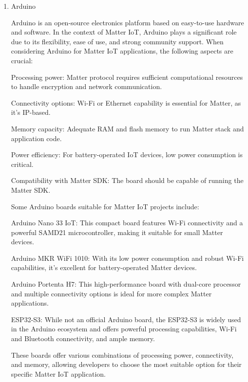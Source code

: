 \documentclass[conference]{IEEEtran}
\begin{document}
\begin{enumerate}[itemsep=2ex, parsep=1ex]
	\item Arduino
	      	      
	      Arduino is an open-source electronics platform based on easy-to-use
	      hardware and software. In the context of Matter IoT, Arduino plays a
	      significant role due to its flexibility, ease of use, and strong community
	      support. When considering Arduino for Matter IoT applications, the
	      following aspects are crucial:
	      	      
	      Processing power: Matter protocol requires sufficient computational resources
	      to handle encryption and network communication.
	      	      
	      Connectivity options: Wi-Fi or Ethernet capability is essential for Matter,
	      as it's IP-based.
	      	      
	      Memory capacity: Adequate RAM and flash memory to run Matter stack and
	      application code.
	      	      
	      Power efficiency: For battery-operated IoT devices, low power consumption
	      is critical.
	      	      
	      Compatibility with Matter SDK: The board should be capable of running the Matter
	      SDK.
	      	      
	      Some Arduino boards suitable for Matter IoT projects include:
	      	      
	      Arduino Nano 33 IoT: This compact board features Wi-Fi connectivity and a
	      powerful SAMD21 microcontroller, making it suitable for small Matter devices.
	      	      
	      Arduino MKR WiFi 1010: With its low power consumption and robust Wi-Fi
	      capabilities, it's excellent for battery-operated Matter devices.
	      	      
	      Arduino Portenta H7: This high-performance board with dual-core processor
	      and multiple connectivity options is ideal for more complex Matter
	      applications.
	      	      
	      ESP32-S3: While not an official Arduino board, the ESP32-S3 is widely used
	      in the Arduino ecosystem and offers powerful processing capabilities, Wi-Fi
	      and Bluetooth connectivity, and ample memory.
	      	      
	      These boards offer various combinations of processing power, connectivity,
	      and memory, allowing developers to choose the most suitable option for their
	      specific Matter IoT application.
	      	      

\end{enumerate}
\end{document}
